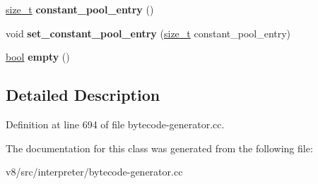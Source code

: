 \begin{DoxyCompactItemize}
\item 
\mbox{\label{classv8_1_1internal_1_1interpreter_1_1BytecodeGenerator_1_1GlobalDeclarationsBuilder_abd1aaac53997e3852d1735f9ee710c7b}} 
\mbox{\hyperlink{classsize__t}{size\+\_\+t}} {\bfseries constant\+\_\+pool\+\_\+entry} ()
\item 
\mbox{\label{classv8_1_1internal_1_1interpreter_1_1BytecodeGenerator_1_1GlobalDeclarationsBuilder_a8ff78aafa8ecb2080d2c1d4ddb58f197}} 
void {\bfseries set\+\_\+constant\+\_\+pool\+\_\+entry} (\mbox{\hyperlink{classsize__t}{size\+\_\+t}} constant\+\_\+pool\+\_\+entry)
\item 
\mbox{\label{classv8_1_1internal_1_1interpreter_1_1BytecodeGenerator_1_1GlobalDeclarationsBuilder_a13d00e71cf8f972e2000106800c048b4}} 
\mbox{\hyperlink{classbool}{bool}} {\bfseries empty} ()
\end{DoxyCompactItemize}


\subsection{Detailed Description}


Definition at line 694 of file bytecode-\/generator.\+cc.



The documentation for this class was generated from the following file\+:\begin{DoxyCompactItemize}
\item 
v8/src/interpreter/bytecode-\/generator.\+cc\end{DoxyCompactItemize}
